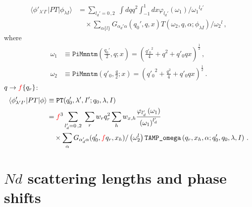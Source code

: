 \documentclass[11pt,aps]{revtex4}
\newcommand{\PF}{{\color{red}f}}
\begin{document}
\begin{equation}
\begin{split}
  \langle \phi'_{\lambda' I'} | P T | \phi_{\lambda I} \rangle &= \sum_{l_d' = 0\, , 2} \; \int dq q^2 \int_{-1}^{1} dx \varphi_{l_d'}(\omega_1)/{\omega_1}^{l_d'}\\
  & \quad \times  \sum_{\alpha\{l\}}  G_{\alpha_d' \alpha} (q_0', q, x)
  T(\omega_2, q, \alpha; \phi_{\lambda I})/{\omega_2}^{l} \, ,
\end{split}
\end{equation}
where
\begin{equation}
\begin{split}
  \omega_1 &\equiv \texttt{PiMmntm}\left(\frac{q_0'}{2}, q; x\right) = \left(\frac{{q'_0}^2}{4} + q^2 + {q'_0} q x \right)^{\frac{1}{2}} \, ,\\
  \omega_2 &\equiv \texttt{PiMmntm}\left(q'_0, \frac{q}{2}; x\right) = \left({q'_0}^2 + \frac{q^2}{4} + {q'_0} q x \right)^{\frac{1}{2}} \, . \label{eqn_defomega}
\end{split}
\end{equation}
$q \to \PF \{q_r\}$:
\begin{equation}
\begin{split}
  \langle \phi'_{\lambda' I'} | P T | \phi \rangle &\equiv \texttt{PT}(q_0', \lambda', I'; q_0, \lambda, I)   \\
  &= \PF^3 \sum_{l_d' = 0\, , 2} \;
  \sum_r w_{r} q_r^2 \sum_h w_{x, h} \frac{\varphi_{l_d'}\left(\omega_1\right)}{\left(\omega_1\right)^{l_d'}} \\
  & \quad \times  \sum_{\alpha} G_{\alpha_d' \alpha}(q_0', \PF q_r, x_h) / \left(\omega_2^l\right) \texttt{TAMP\_omega}\left(q_r, x_h, \alpha;  q_0', q_0, \lambda, I\right)  \, .
\end{split}
\end{equation}

\section{$Nd$ scattering lengths and phase shifts}
\end{document}
